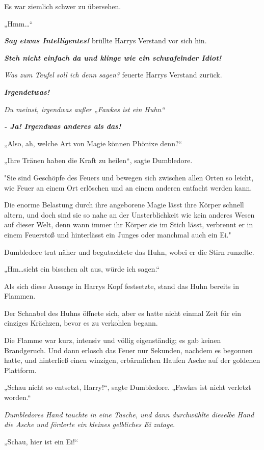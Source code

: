 {Es war ziemlich schwer zu übersehen.

„Hmm…“

\textbf{\emph{Sag etwas Intelligentes!}} brüllte Harrys Verstand vor sich hin.

\textbf{\emph{Steh nicht einfach da und klinge wie ein schwafelnder Idiot!}}

\emph{Was zum Teufel soll ich denn sagen?} feuerte Harrys Verstand zurück.

\textbf{\emph{Irgendetwas!}}

\emph{Du meinst, irgendwas außer „Fawkes ist ein Huhn“}

\textbf{\emph{- Ja! Irgendwas anderes als das!}}

„Also, ah, welche Art von Magie können Phönixe denn?“

„Ihre Tränen haben die Kraft zu heilen“, sagte Dumbledore.

"Sie sind Geschöpfe des Feuers und bewegen sich zwischen allen Orten so leicht, wie Feuer an einem Ort erlöschen und an einem anderen entfacht werden kann.

Die enorme Belastung durch ihre angeborene Magie lässt ihre Körper schnell altern, und doch sind sie so nahe an der Unsterblichkeit wie kein anderes Wesen auf dieser Welt, denn wann immer ihr Körper sie im Stich lässt, verbrennt er in einem Feuerstoß und hinterlässt ein Junges oder manchmal auch ein Ei."

Dumbledore trat näher und begutachtete das Huhn, wobei er die Stirn runzelte.

„Hm…sieht ein bisschen alt aus, würde ich sagen.“

Als sich diese Aussage in Harrys Kopf festsetzte, stand das Huhn bereits in Flammen.

Der Schnabel des Huhns öffnete sich, aber es hatte nicht einmal Zeit für ein einziges Krächzen, bevor es zu verkohlen begann.

Die Flamme war kurz, intensiv und völlig eigenständig; es gab keinen Brandgeruch. Und dann erlosch das Feuer nur Sekunden, nachdem es begonnen hatte, und hinterließ einen winzigen, erbärmlichen Haufen Asche auf der goldenen Plattform.

„Schau nicht so entsetzt, Harry!“, sagte Dumbledore. „Fawkes ist nicht verletzt worden.“

\emph{Dumbledores Hand tauchte in eine Tasche, und dann durchwühlte dieselbe Hand die Asche und förderte ein kleines gelbliches Ei zutage.}

„Schau, hier ist ein Ei!“

}
